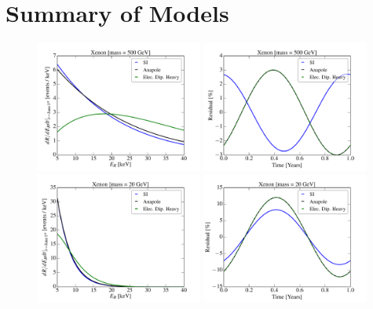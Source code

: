 \documentclass[11pt]{article}
\begin{document}
\section{Summary of Models}


\begin{figure}
\centering
\includegraphics[width=0.49\textwidth, trim=0.cm 0.0cm 0.cm 0.0cm,clip=true]{plots/RecoilComparison_500GeV.pdf}
\includegraphics[width=0.49\textwidth, trim=0.cm 0.0cm 0.cm 0.0cm,clip=true]{plots/Xenon_SIvsAnapole_500GeV_Residual_Theory.pdf}
\includegraphics[width=0.49\textwidth, trim=0.cm 0.0cm 0.cm 0.0cm,clip=true]{plots/RecoilComparison_20GeV.pdf}
\includegraphics[width=0.49\textwidth, trim=0.cm 0.0cm 0.cm 0.0cm,clip=true]{plots/Xenon_SIvsAnapole_20GeV_Residual_Theory.pdf}

\end{figure}
\end{document}
